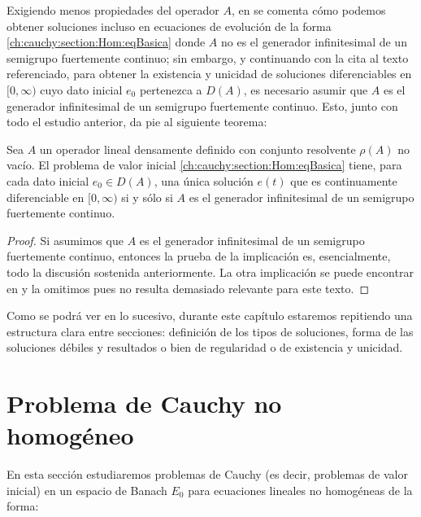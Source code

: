 Exigiendo menos propiedades del operador $A$, en \cite[Cap.~4, \S 1]{pazy-1983-sem-lin-ope} se comenta cómo podemos obtener soluciones incluso en ecuaciones de evolución de la forma \eqref{ch:cauchy:section:Hom:eqBasica} donde $A$ no es el generador infinitesimal de un semigrupo fuertemente continuo; sin embargo, y continuando con la cita al texto referenciado, para obtener la existencia y unicidad de soluciones diferenciables en $[0, \infty)$ cuyo dato inicial $e_0$ pertenezca a $D(A)$, es necesario asumir que $A$ es el generador infinitesimal de un semigrupo fuertemente continuo. Esto, junto con todo el estudio anterior, da pie al siguiente teorema:\\

\begin{Teorema}
    \label{cauchy:hom:ExistenciaYUnicidadFuerte}

    Sea $A$ un operador lineal densamente definido con conjunto resolvente $\rho(A)$ no vacío. El problema de valor inicial \eqref{ch:cauchy:section:Hom:eqBasica} tiene, para cada dato inicial $e_0 \in D(A)$, una única solución $e(t)$ que es continuamente diferenciable en $[0, \infty)$ si y sólo si $A$ es el generador infinitesimal de un semigrupo fuertemente continuo.
\end{Teorema}

\begin{proof}
    Si asumimos que $A$ es el generador infinitesimal de un semigrupo fuertemente continuo, entonces la prueba de la implicación es, esencialmente, todo la discusión sostenida anteriormente. La otra implicación se puede encontrar en \cite[Cap.~4, \S 1, Teorema~1.3]{pazy-1983-sem-lin-ope} y la omitimos pues no resulta demasiado relevante para este texto.
\end{proof}

Como se podrá ver en lo sucesivo, durante este capítulo estaremos repitiendo una estructura clara entre secciones: definición de los tipos de soluciones, forma de las soluciones débiles y resultados o bien de regularidad o de existencia y unicidad. 

\section{Problema de Cauchy no homogéneo}
\label{ch:cauchy:section:noHom}

En esta sección estudiaremos problemas de Cauchy (es decir, problemas de valor inicial) en un espacio de Banach $E_0$ para ecuaciones lineales no homogéneas de la forma:

